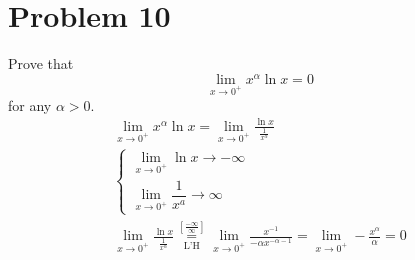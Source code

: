 \documentclass[12pt]{article}
\newcommand{\problem}[1]{\section{Problem #1}}
\begin{document}
\problem{10}
Prove that
$$\lim_{x \to 0^+} x^\alpha \ln x = 0$$
for any $\alpha > 0$.
\begin{gather*}
    \lim\limits_{x \to 0^+} x^\alpha \ln x =  \lim\limits_{x \to 0^+} \frac{\ln x}{\frac{1}{x^{\alpha}}}\\
    \begin{cases}
        \lim\limits_{x \to 0^+} \ln x \to -\infty\\
        \lim\limits_{x \to 0^+} \dfrac{1}{x^a} \to \infty
    \end{cases}\\
    \lim\limits_{x \to 0^+}\frac{\ln x}{\frac{1}{x^\alpha}}\underset{\text{L'H}}{\overset{\left[\frac{-\infty}{\infty}\right]}{=}} \lim\limits_{x \to 0^+} \frac{x^{-1}}{-\alpha x^{-\alpha -1}}=\lim\limits_{x \to 0^+}-\frac{x^{\alpha}}{\alpha }=\boxed{0}
\end{gather*}
\end{document}
